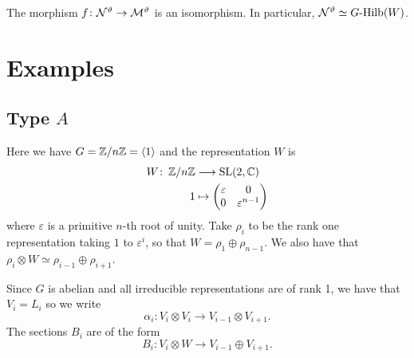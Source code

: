 \documentclass{amsart}
\theoremstyle{definition}
\begin{document}
\begin{corollary}
The morphism $f \colon \mathcal{N}^\vartheta \rightarrow \mathcal{M}^\vartheta$ is an isomorphism.
In particular, $\mathcal{N}^\vartheta \simeq G\textup{-Hilb}(W)$.
\end{corollary}

\section{Examples}



\subsection{Type $A$}
Here we have $G=\mathbb{Z}/n\mathbb{Z}=\langle 1\rangle$ and the representation $W$ is
\begin{align*}
    W \colon \, \mathbb{Z}/n\mathbb{Z} &\longrightarrow \operatorname{SL}(2,\mathbb{C}) \\
    1 &\mapsto \begin{pmatrix} \varepsilon & 0 \\ 0 & \varepsilon^{n-1} \end{pmatrix}
\end{align*}
where $\varepsilon$ is a primitive $n$-th root of unity.
Take $\rho_i$ to be the rank one representation taking $1$ to $\varepsilon^i$, so that $W=\rho_1 \oplus \rho_{n-1}$.
We also have that $\rho_i \otimes W \simeq \rho_{i-1} \oplus \rho_{i+1}$.

Since $G$ is abelian and all irreducible representations are of rank 1, we have that $V_i = L_i$ so we write $$\alpha_i \colon V_i \otimes V_i \longrightarrow V_{i-1} \otimes V_{i+1}.$$
The sections $B_i$ are of the form $$B_i \colon V_i \otimes W \longrightarrow V_{i-1} \oplus V_{i+1}.$$
\end{document}
